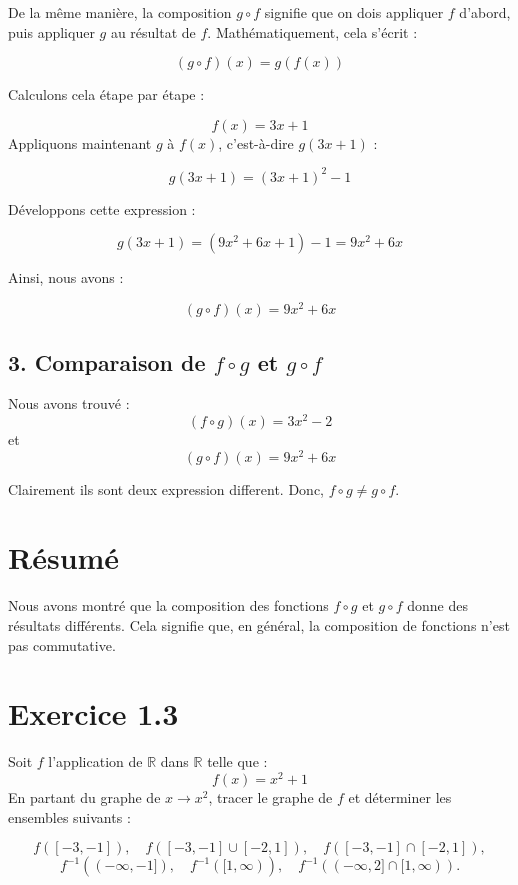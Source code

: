 \documentclass[a4paper,oneside,12pt]{amsbook}
\theoremstyle{definition}
\theoremstyle{remark}
\begin{document}
De la même manière, la composition \( g \circ f \) signifie que on dois appliquer \( f \) d'abord, puis appliquer \( g \) au résultat de \( f \). Mathématiquement, cela s'écrit :

\[
(g \circ f)(x) = g(f(x))
\]

Calculons cela étape par étape :

\[
f(x) = 3x + 1
\]
Appliquons maintenant \( g \) à \( f(x) \), c'est-à-dire \( g(3x + 1) \) :

\[
g(3x + 1) = (3x + 1)^2 - 1
\]

Développons cette expression :

\[
g(3x + 1) = (9x^2 + 6x + 1) - 1 = 9x^2 + 6x
\]

Ainsi, nous avons :

\[
(g \circ f)(x) = 9x^2 + 6x
\]

\subsection*{3. Comparaison de \( f \circ g \) et \( g \circ f \)}

Nous avons trouvé :
\[
(f \circ g)(x) = 3x^2 - 2
\]
et
\[
(g \circ f)(x) = 9x^2 + 6x
\]


Clairement ils sont deux expression different. Donc, \( f \circ g \neq g \circ f \).

\section*{Résumé}

Nous avons montré que la composition des fonctions \( f \circ g \) et \( g \circ f \) donne des résultats différents. Cela signifie que, en général, la composition de fonctions n'est pas commutative.



\section*{Exercice 1.3}

Soit \( f \) l'application de \( \mathbb{R} \) dans \( \mathbb{R} \) telle que :
\[
f(x) = x^2 + 1
\]
En partant du graphe de \( x \to x^2 \), tracer le graphe de \( f \) et déterminer les ensembles suivants :

\[
f([-3, -1]), \quad f([-3, -1] \cup [-2, 1]), \quad f([-3, -1] \cap [-2, 1]),
\]
\[
f^{-1}((-\infty, -1]), \quad f^{-1}([1, \infty)), \quad f^{-1}((-\infty, 2] \cap [1, \infty)).
\]
\end{document}
